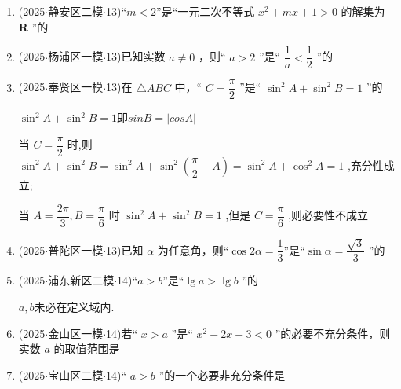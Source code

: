 \begin{enumerate}
    \item (2025$\cdot$静安区二模$\cdot$13)“$m<2$”是“一元二次不等式 ${x}^{2} + {mx} + 1 > 0$ 的解集为 $\mathbf{R}$ ”的 

    \item (2025$\cdot$杨浦区一模$\cdot$13)已知实数 $a \neq  0$ ，则“ $a > 2$ ”是“ $\dfrac{1}{a} < \dfrac{1}{2}$ ”的

    \item (2025$\cdot$奉贤区一模$\cdot$13)在 $\bigtriangleup  {ABC}$ 中，“ $C = \dfrac{\pi }{2}$ ”是“ ${\sin }^{2}A + {\sin }^{2}B = 1$ ”的 
    \begin{jieda}
        ${\sin }^{2}A + {\sin }^{2}B = 1$即$sinB = |cosA|$
        
        当 $C = \dfrac{\pi }{2}$ 时,则 ${\sin }^{2}A + {\sin }^{2}B = {\sin }^{2}A + {\sin }^{2}\left( {\dfrac{\pi }{2} - A}\right)  = {\sin }^{2}A + {\cos }^{2}A = 1$ ,充分性成立; 
        
        当 $A = \dfrac{2\pi }{3},B = \dfrac{\pi }{6}$ 时 ${\sin }^{2}A + {\sin }^{2}B = 1$ ,但是 $C = \dfrac{\pi }{6}$ ,则必要性不成立
    \end{jieda}

    \item (2025$\cdot$普陀区一模$\cdot$13)已知 $\alpha$ 为任意角，则“$\cos {2\alpha } = \dfrac{1}{3}$”是“$\sin \alpha  = \dfrac{\sqrt{3}}{3}$ ”的 

    \item (2025$\cdot$浦东新区二模$\cdot$14)“$a>b$”是“$\lg a > \lg b$ ”的 
    \begin{jieda}
        $a, b$未必在定义域内.
    \end{jieda}

    \item (2025$\cdot$金山区一模$\cdot$14)若“ $x > a$ ”是“ ${x}^{2} - {2x} - 3 < 0$ ”的必要不充分条件，则实数 $a$ 的取值范围是 

    \item (2025$\cdot$宝山区二模$\cdot$14)“ $a > b$ ”的一个必要非充分条件是 


\end{enumerate}
